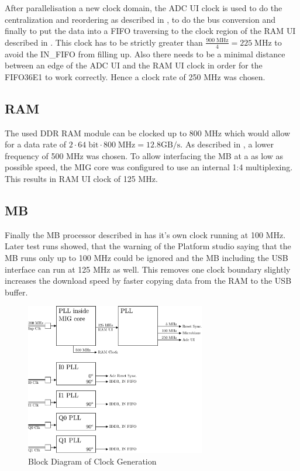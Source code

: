 After parallelisation a new clock domain, the \gls{ADC} \gls{UI} clock
is used to do the centralization and reordering as described in
,
to do the bus conversion and finally to put the data into a \gls{FIFO}
traversing to the clock region of the \gls{RAM} \gls{UI} described
in . This clock has to be strictly greater than
$\frac{900\;\text{MHz}}{4} = 225\;\text{MHz}$ to avoid the
IN\_FIFO from filling up. Also there needs to be a minimal
distance between an edge of the \gls{ADC} \gls{UI} and the
\gls{RAM} \gls{UI} clock in order for the FIFO36E1 to work correctly.
Hence a clock rate of 250 MHz was chosen. \\

\subsection{\gls{RAM}}
\label{sec:fpga_clock_ram}
The used \gls{DDR} \gls{RAM} module can be clocked up to 800 MHz which would
allow for a data rate of
$2 \cdot 64\;\text{bit} \cdot 800\;\text{MHz} = 12.8 \text{GB} / \text{s}$.
As described in , a lower frequency of 500 MHz
was chosen. To allow interfacing the \gls{MB} at a as low as possible speed,
the \gls{MIG} core was configured to use an internal 1:4 multiplexing. This results
in \gls{RAM} \gls{UI} clock of 125 MHz.

\subsection{\acrfull{MB}}
Finally the \gls{MB} processor described in  has
it's own clock running at 100 MHz. \\

Later test runs showed, that the warning of the Platform studio saying that the
\gls{MB} runs only up to 100 MHz could be ignored and the \gls{MB} including
the \gls{USB} interface can run at 125 MHz as well. This removes one clock boundary
slightly increases the download speed by faster copying data from the
\gls{RAM} to the \gls{USB} buffer. \\

\begin{figure}
  \centering
  \includegraphics[width=0.7\textwidth]{figures/clock_generation}
  \caption{Block Diagram of Clock Generation}
  \label{fig:fpga_clock_generation}
\end{figure}


